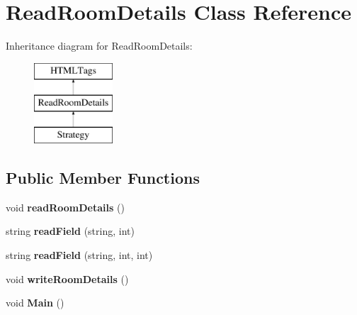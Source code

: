 \hypertarget{classReadRoomDetails}{\section{Read\-Room\-Details Class Reference}
\label{classReadRoomDetails}
}
Inheritance diagram for Read\-Room\-Details\-:\begin{figure}[H]
\begin{center}
\leavevmode
\includegraphics[height=3.000000cm]{classReadRoomDetails}
\end{center}
\end{figure}
\subsection*{Public Member Functions}
\begin{DoxyCompactItemize}
\item 
\hypertarget{classReadRoomDetails_a64f4053481ddccc38b0a3e10d1e126e8}{void {\bfseries read\-Room\-Details} ()}\label{classReadRoomDetails_a64f4053481ddccc38b0a3e10d1e126e8}

\item 
\hypertarget{classReadRoomDetails_ad791618ab41f2eaabb560fdc821d378b}{string {\bfseries read\-Field} (string, int)}\label{classReadRoomDetails_ad791618ab41f2eaabb560fdc821d378b}

\item 
\hypertarget{classReadRoomDetails_ac342a03330fd3a959aabdcebf4dde04c}{string {\bfseries read\-Field} (string, int, int)}\label{classReadRoomDetails_ac342a03330fd3a959aabdcebf4dde04c}

\item 
\hypertarget{classReadRoomDetails_a1a953228597d45f1346ea0b974b3cf1a}{void {\bfseries write\-Room\-Details} ()}\label{classReadRoomDetails_a1a953228597d45f1346ea0b974b3cf1a}

\item 
\hypertarget{classReadRoomDetails_a0492ff264c9960310b181225d008092c}{void {\bfseries Main} ()}\label{classReadRoomDetails_a0492ff264c9960310b181225d008092c}

\end{DoxyCompactItemize}
